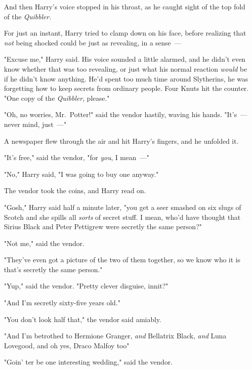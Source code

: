 And then Harry's voice stopped in his throat, as he caught sight of the top
fold of the \emph{Quibbler.}


For just an instant, Harry tried to clamp down on his face, before realizing
that \emph{not} being shocked could be just as revealing, in a sense~---

"Excuse me," Harry said. His voice sounded a little alarmed, and he didn't even
know whether that was too revealing, or just what his normal reaction
\emph{would} be if he didn't know anything. He'd spent too much time around
Slytherins, he was forgetting how to keep secrets from ordinary people. Four
Knuts hit the counter. "One copy of the \emph{Quibbler,} please."

"Oh, no worries, Mr.~Potter!" said the vendor hastily, waving his hands.
"It's~--- never mind, just~---"

A newspaper flew through the air and hit Harry's fingers, and he unfolded it.


"It's free," said the vendor, "for \emph{you}, I mean~---"

"No," Harry said, "I was going to buy one anyway."

The vendor took the coins, and Harry read on.

"Gosh," Harry said half a minute later, "you get a seer smashed on six slugs of
Scotch and she spills all \emph{sorts} of secret stuff. I mean, who'd have
thought that Sirius Black and Peter Pettigrew were secretly the same person?"

"Not me," said the vendor.

"They've even got a picture of the two of them together, so we know who it is
that's secretly the same person."

"Yup," said the vendor. "Pretty clever disguise, innit?"

"And I'm secretly sixty-five years old."

"You don't look half that," the vendor said amiably.

"And I'm betrothed to Hermione Granger, \emph{and} Bellatrix Black, \emph{and}
Luna Lovegood, and oh yes, Draco Malfoy too{\el}"

"Goin' ter be one interesting wedding," said the vendor.

